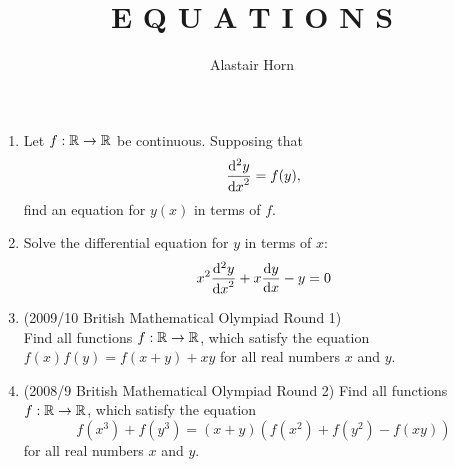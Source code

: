 \documentclass[a4paper,12pt]{article}
\author{Alastair Horn}
\title{E Q U A T I O N S}
\begin{document}
\maketitle

\begin{enumerate}
 \item
  Let \(f: \mathbb R \to \mathbb R\) be continuous. Supposing that
  \begin{equation*}
   \dv[2]<y>{x} = f(y),
  \end{equation*}
  find an equation for \(y(x)\) in terms of \(f\).
 \item Solve the differential equation for \(y\) in terms of \(x\):
  \begin{equation*}
      x^2\dv[2]<y>{x} + x\dv<y>{x} - y = 0
  \end{equation*}
 \item (2009/10 British Mathematical Olympiad Round 1) \\
  Find all functions \(f: \mathbb R \to \mathbb R\), which satisfy the equation
  \(f(x)f(y) = f(x + y) + xy\) for all real numbers \(x\) and \(y\).
 \item (2008/9 British Mathematical Olympiad Round 2)
  Find all functions \(f: \mathbb R \to \mathbb R\), which satisfy the equation
  \[f(x^3) + f(y^3) = (x + y)(f(x^2) + f(y^2) - f(xy))\] for all real numbers
  \(x\) and \(y\).

\end{enumerate}
\end{document}
